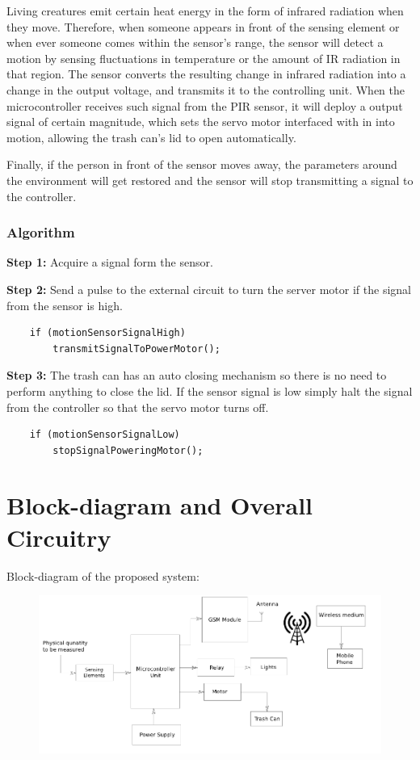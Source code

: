 Living creatures emit certain heat energy in the form of infrared
radiation when they move. Therefore, when someone appears in front of
the sensing element or when ever someone comes within the sensor's
range, the sensor will detect a motion by sensing fluctuations in
temperature or the amount of IR radiation in that region. The sensor
converts the resulting change in infrared radiation into a change in
the output voltage, and transmits it to the controlling unit. When the
microcontroller receives such signal from the PIR sensor, it will
deploy a output signal of certain magnitude, which sets the servo
motor interfaced with in into motion, allowing the trash can's lid to
open automatically.

Finally, if the person in front of the sensor moves away, the
parameters around the environment will get restored and the sensor
will stop transmitting a signal to the controller.

\subsubsection{Algorithm}

\textbf{Step 1:} Acquire a signal form the sensor.

\textbf{Step 2:} Send a pulse to the external circuit to turn the
server motor if the signal from the sensor is high.

\begin{verbatim}
    if (motionSensorSignalHigh)
        transmitSignalToPowerMotor();
\end{verbatim}
\textbf{Step 3:} The trash can has an auto closing mechanism so there
is no need to perform anything to close the lid. If the sensor signal
is low simply halt the signal from the controller so that the servo
motor turns off.

\begin{verbatim}
    if (motionSensorSignalLow)
        stopSignalPoweringMotor();
\end{verbatim}

\newpage
\section{Block-diagram and Overall Circuitry}

Block-diagram of the proposed system:

\begin{figure}[H]
  \centering
  \includegraphics[width=\textwidth]{block-diagram}
\end{figure}

